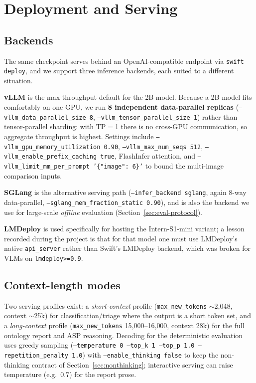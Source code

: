 \documentclass[11pt,a4paper]{article}
\begin{document}
\section{Deployment and Serving}
\label{sec:deploy}

\subsection{Backends}
The same checkpoint serves behind an OpenAI-compatible endpoint via \texttt{swift deploy}, and we support three inference backends, each suited to a different situation.

\textbf{vLLM} is the max-throughput default for the 2B model. Because a 2B model fits comfortably on one GPU, we run \textbf{8 independent data-parallel replicas} (\texttt{--vllm\_data\_parallel\_size 8}, \texttt{--vllm\_tensor\_parallel\_size 1}) rather than tensor-parallel sharding: with TP$=$1 there is no cross-GPU communication, so aggregate throughput is highest. Settings include \texttt{--vllm\_gpu\_memory\_utilization 0.90}, \texttt{--vllm\_max\_num\_seqs 512}, \texttt{--vllm\_enable\_prefix\_caching true}, FlashInfer attention, and \texttt{--vllm\_limit\_mm\_per\_prompt '\{"image": 6\}'} to bound the multi-image comparison inputs.

\textbf{SGLang} is the alternative serving path (\texttt{--infer\_backend sglang}, again 8-way data-parallel, \texttt{--sglang\_mem\_fraction\_static 0.90}), and is also the backend we use for large-scale \emph{offline} evaluation (Section~\ref{sec:eval-protocol}).

\textbf{LMDeploy} is used specifically for hosting the Intern-S1-mini variant; a lesson recorded during the project is that for that model one must use LMDeploy's native \texttt{api\_server} rather than Swift's LMDeploy backend, which was broken for VLMs on \texttt{lmdeploy>=0.9}.

\subsection{Context-length modes}
Two serving profiles exist: a \emph{short-context} profile (\texttt{max\_new\_tokens} $\sim$2{,}048, context $\sim$25k) for classification/triage where the output is a short token set, and a \emph{long-context} profile (\texttt{max\_new\_tokens} 15{,}000--16{,}000, context 28k) for the full ontology report and ASP reasoning. Decoding for the deterministic evaluation uses greedy sampling (\texttt{--temperature 0 --top\_k 1 --top\_p 1.0 --repetition\_penalty 1.0}) with \texttt{--enable\_thinking false} to keep the non-thinking contract of Section~\ref{sec:nonthinking}; interactive serving can raise temperature (e.g.\ 0.7) for the report prose.
\end{document}
